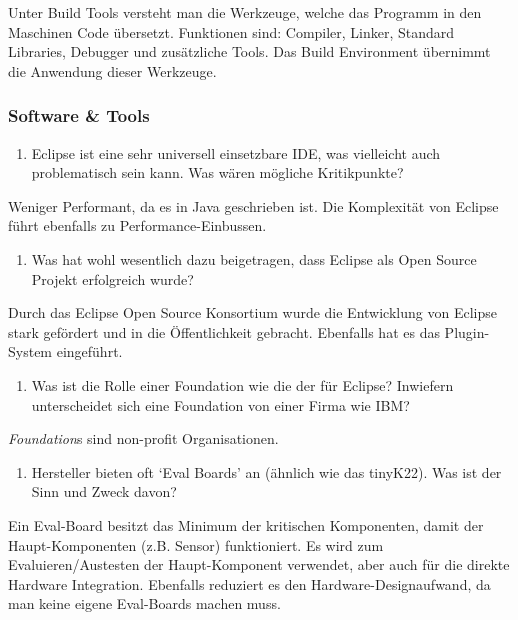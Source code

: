 \documentclass[
  10pt,
  a4paper,
]{article}
\providecommand{\tightlist}{%
  \setlength{\itemsep}{0pt}\setlength{\parskip}{0pt}}\usepackage{longtable,booktabs,array}
\numberwithin{equation}{section}
\begin{document}
Unter Build Tools versteht man die Werkzeuge, welche das Programm in den
Maschinen Code übersetzt. Funktionen sind: Compiler, Linker, Standard
Libraries, Debugger und zusätzliche Tools. Das Build Environment
übernimmt die Anwendung dieser Werkzeuge.

\hypertarget{software-tools}{%
\subsubsection{Software \& Tools}\label{software-tools}}

\begin{enumerate}
\def\labelenumi{\arabic{enumi}.}
\tightlist
\item
  Eclipse ist eine sehr universell einsetzbare IDE, was vielleicht auch
  problematisch sein kann. Was wären mögliche Kritikpunkte?
\end{enumerate}

Weniger Performant, da es in Java geschrieben ist. Die Komplexität von
Eclipse führt ebenfalls zu Performance-Einbussen.

\begin{enumerate}
\def\labelenumi{\arabic{enumi}.}
\setcounter{enumi}{1}
\tightlist
\item
  Was hat wohl wesentlich dazu beigetragen, dass Eclipse als Open Source
  Projekt erfolgreich wurde?
\end{enumerate}

Durch das Eclipse Open Source Konsortium wurde die Entwicklung von
Eclipse stark gefördert und in die Öffentlichkeit gebracht. Ebenfalls
hat es das Plugin-System eingeführt.

\begin{enumerate}
\def\labelenumi{\arabic{enumi}.}
\setcounter{enumi}{2}
\tightlist
\item
  Was ist die Rolle einer Foundation wie die der für Eclipse? Inwiefern
  unterscheidet sich eine Foundation von einer Firma wie IBM?
\end{enumerate}

\emph{Foundation}s sind non-profit Organisationen.

\begin{enumerate}
\def\labelenumi{\arabic{enumi}.}
\setcounter{enumi}{3}
\tightlist
\item
  Hersteller bieten oft `Eval Boards' an (ähnlich wie das tinyK22). Was
  ist der Sinn und Zweck davon?
\end{enumerate}

Ein Eval-Board besitzt das Minimum der kritischen Komponenten, damit der
Haupt-Komponenten (z.B. Sensor) funktioniert. Es wird zum
Evaluieren/Austesten der Haupt-Komponent verwendet, aber auch für die
direkte Hardware Integration. Ebenfalls reduziert es den
Hardware-Designaufwand, da man keine eigene Eval-Boards machen muss.
\end{document}
